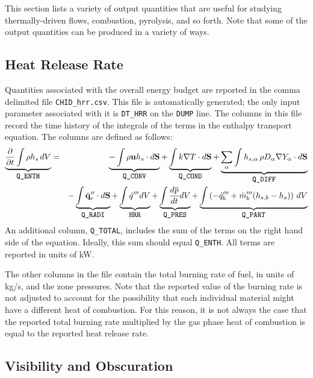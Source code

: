 \documentclass[11pt]{book}
\newcommand{\ct}{\tt\small}
\newcommand{\dS}{{d\bf S}}
\newcommand{\bu}{{\bf u}}
\newcommand{\dq}{\dot{q}}
\newcommand{\dm}{\dot{m}}
\begin{document}
This section lists a variety of output quantities that are useful for studying thermally-driven flows, combustion, pyrolysis, and so forth. Note that some
of the output quantities can be produced in a variety of ways.


\subsection{Heat Release Rate}
\label{info:HRR}

Quantities associated with the overall energy budget are reported in
the comma delimited file {\ct CHID\_hrr.csv}.  This file is
automatically generated; the only input parameter associated with it
is {\ct DT\_HRR} on the {\ct DUMP} line. The columns in this file record the time history of the integrals of the terms in the enthalpy transport equation.
The columns are defined as follows:
\begin{eqnarray}
\label{eqn_enthalpytransport}
\underbrace{\frac{\partial}{\partial t} \int \rho h_s \, dV }_{\hbox{\ct Q\_ENTH}} &=&
\underbrace{- \int \rho \bu h_s \cdot \dS}_{\hbox{\ct Q\_CONV}}
+\underbrace{\int k \nabla T \cdot \dS}_{\hbox{\ct Q\_COND}}
+\underbrace{\sum_\alpha \int h_{s,\alpha} \, \rho D_\alpha \nabla Y_\alpha \cdot \dS}_{\hbox{\ct Q\_DIFF}}  \nonumber \\
&&
-\underbrace{\int \dot{\mathbf{q}}^{\prime\prime}_{r} \cdot \dS}_{\hbox{\ct Q\_RADI}}
+\underbrace{\int \dot{q}''' dV}_{\hbox{\ct HRR}}
+\underbrace{\int \frac{d \overline{p} }{dt} dV}_{\hbox{\ct Q\_PRES}}
+\underbrace{\int \left( -\dq_b''' + \dm_b'''(h_{s,b}-h_s)  \right) \, dV}_{\hbox{\ct Q\_PART}}
\end{eqnarray}
An additional column, {\ct Q\_TOTAL}, includes the sum of the terms on the right hand side of the equation. Ideally, this sum should equal {\ct Q\_ENTH}. All terms
are reported in units of kW.

The other columns in the file contain the total burning rate of
fuel, in units of kg/s, and the zone pressures. Note that the reported value of the burning rate is not adjusted to account for the possibility that each individual
material might have a different heat of combustion. For this reason, it is not always the case that the reported total
burning rate multiplied by the gas phase heat of combustion is equal to the reported heat release rate.







\subsection{Visibility and Obscuration}
\label{info:visibility}
\label{info:obscuration}
\end{document}
